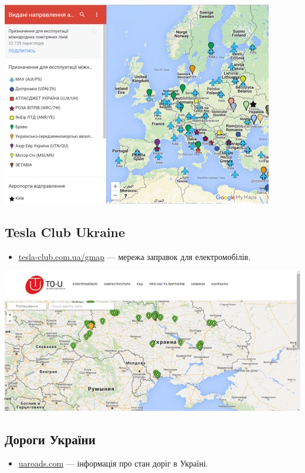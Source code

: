\includegraphics{images/029.jpg}

\subsection{Tesla Club Ukraine}

\begin{itemize}
    \item \href{http://tesla-club.com.ua/gmap}{tesla-club.com.ua/gmap} — мережа заправок для електромобілів.
\end{itemize}

\includegraphics{images/030.jpg}

\subsection{Дороги України}

\begin{itemize}
    \item \href{http://uaroads.com/}{uaroads.com} — інформація про стан доріг в Україні.
\end{itemize}

